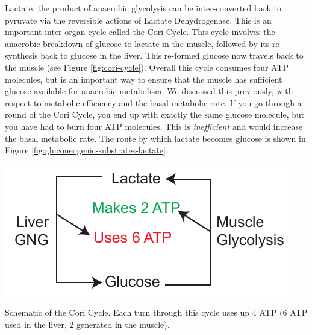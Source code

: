 \documentclass{tufte-handout}
\begin{document}
Lactate, the product of anaerobic glycolysis can be inter-converted back to pyruvate via the reversible actions of Lactate Dehydrogenase.  This is an important inter-organ cycle called the Cori Cycle.  This cycle involves the anaerobic breakdown of glucose to lactate in the muscle, followed by its re-synthesis back to glucose in the liver.  This re-formed glucose now travels back to the muscle (see Figure \ref{fig:cori-cycle}).  Overall this cycle consumes four ATP molecules, but is an important way to ensure that the muscle has sufficient glucose available for anaerobic metabolism.  We discussed this previously, with respect to metabolic efficiency and the basal metabolic rate.  If you go through a round of the Cori Cycle, you end up with exactly the same glucose molecule, but you have had to burn four ATP molecules.  This is \emph{inefficient} and would increase the basal metabolic rate.  The route by which lactate becomes glucose is shown in Figure \ref{fig:gluconeogenic-substrates-lactate}.

\begin{marginfigure}
\includegraphics{figures/cori-cycle.pdf}
\caption{Schematic of the Cori Cycle.  Each turn through this cycle uses up 4 ATP (6 ATP used in the liver, 2 generated in the muscle).}
\label{fig:cori-cycle}
\end{marginfigure}
\end{document}
